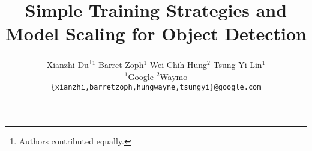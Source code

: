 \documentclass[final]{cvpr}
\begin{document}
\title{Simple Training Strategies and Model Scaling for Object Detection}


\author{
Xianzhi Du\thanks{Authors contributed equally.}\hspace{2mm}$^1$\qquad
Barret Zoph\footnotemark[1]\hspace{2mm}$^1$\qquad
Wei-Chih Hung$^2$\qquad
Tsung-Yi Lin$^1$\\
$^1$Google\qquad
$^2$Waymo
\\
{\tt\small \{xianzhi,barretzoph,hungwayne,tsungyi\}@google.com}
}

\maketitle
\thispagestyle{empty}
\end{document}
